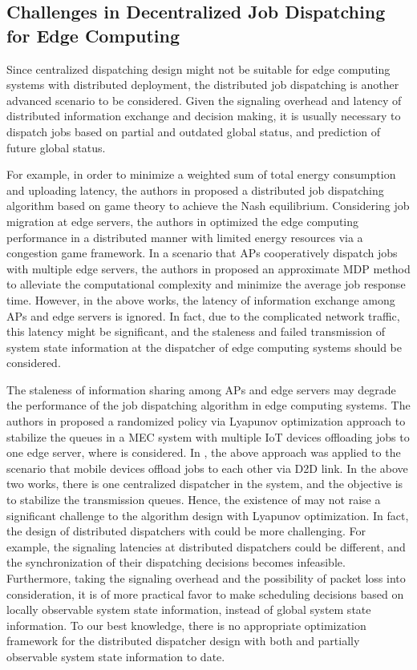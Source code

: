 \subsection{Challenges in Decentralized Job Dispatching for Edge Computing}
Since centralized dispatching design might not be suitable for edge computing systems with distributed deployment, the distributed job dispatching is another advanced scenario to be considered.
Given the signaling overhead and latency of distributed information exchange and decision making, it is usually necessary to dispatch jobs based on partial and outdated global status, and prediction of future global status.

For example, in order to minimize a weighted sum of total energy consumption and uploading latency, the authors in \cite{ToN-Xuchen2016} proposed a distributed job dispatching algorithm based on game theory to achieve the Nash equilibrium. 
Considering job migration at edge servers, the authors in \cite{ToN-xujie2018} optimized the edge computing performance in a distributed manner with limited energy resources via a congestion game framework.
In a scenario that APs cooperatively dispatch jobs with multiple edge servers, the authors in \cite{jcin2020-hong} proposed an approximate MDP method to alleviate the computational complexity and minimize the average job response time.
However, in the above works, the latency of information exchange among APs and edge servers is ignored.
In fact, due to the complicated network traffic, this latency might be significant, and the staleness and failed transmission of system state information at the dispatcher of edge computing systems should be considered.

The staleness of information sharing among APs and edge servers may degrade the performance of the job dispatching algorithm in edge computing systems.
The authors in \cite{JSAC17-LyuX} proposed a randomized policy via Lyapunov optimization approach to stabilize the queues in a MEC system with multiple IoT devices offloading jobs to one edge server, where {\brlatency} is considered.
In \cite{TWC18-LyuX}, the above approach was applied to the scenario that mobile devices offload jobs to each other via D2D link.
In the above two works, there is one centralized dispatcher in the system, and the objective is to stabilize the transmission queues.
Hence, the existence of {\brlatency} may not raise a significant challenge to the algorithm design with Lyapunov optimization.
In fact, the design of distributed dispatchers with {\brlatency} could be more challenging.
For example, the signaling latencies at distributed dispatchers could be different, and the synchronization of their dispatching decisions becomes infeasible.
Furthermore, taking the signaling overhead and the possibility of packet loss into consideration, it is of more practical favor to make scheduling decisions based on locally observable system state information, instead of global system state information.
To our best knowledge, there is no appropriate optimization framework for the distributed dispatcher design with both {\brlatency} and partially observable system state information to date.

